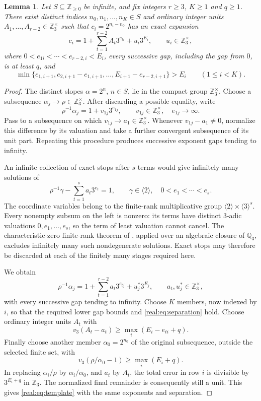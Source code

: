 \documentclass[11pt]{article}
\newtheorem{lemma}[theorem]{Lemma}
\theoremstyle{definition}
\theoremstyle{remark}
\newcommand{\Z}{\mathbb Z}
\newcommand{\Q}{\mathbb Q}
\begin{document}
\begin{lemma}\label{real:lem:extraction}
Let $S\subseteq\Z_{\ge0}$ be infinite, and fix integers
$r\ge3$, $K\ge1$ and $q\ge1$. There exist distinct indices
$n_0,n_1,\ldots,n_K\in S$ and ordinary integer units
$A_1,\ldots,A_{r-2}\in\Z_3^\times$ such that
$c_i=2^{n_i-n_0}$ has an exact expansion
\begin{equation}\label{real:eq:template}
 c_i=1+\sum_{t=1}^{r-2}A_t3^{e_{ti}}+u_i3^{E_i},
 \qquad u_i\in\Z_3^\times,
\end{equation}
where $0<e_{1i}<\cdots<e_{r-2,i}<E_i$, every successive gap,
including the gap from $0$, is at least $q$, and
\begin{equation}\label{real:eq:separation}
 \min\{e_{1,i+1},e_{2,i+1}-e_{1,i+1},\ldots,
                 E_{i+1}-e_{r-2,i+1}\}>E_i\qquad(1\le i<K).
\end{equation}
\end{lemma}
\begin{proof}
The distinct slopes $\alpha=2^n$, $n\in S$, lie in the compact group
$\Z_3^\times$. Choose a subsequence $\alpha_j\to\rho\in\Z_3^\times$.
After discarding a possible equality, write
\[
 \rho^{-1}\alpha_j=1+v_{1j}3^{e_{1j}},
 \qquad v_{1j}\in\Z_3^\times,\quad e_{1j}\to\infty.
\]
Pass to a subsequence on which $v_{1j}\to a_1\in\Z_3^\times$.
Whenever $v_{1j}-a_1\ne0$, normalize this difference by its valuation
and take a further convergent subsequence of its unit part. Repeating
this procedure produces successive exponent gaps tending to infinity.

An infinite collection of exact stops after $s$ terms would give
infinitely many solutions of
\[
 \rho^{-1}\gamma-\sum_{t=1}^{s}a_t3^{e_t}=1,
 \qquad \gamma\in\langle2\rangle,\quad 0<e_1<\cdots<e_s.
\]
The coordinate variables belong to the finite-rank multiplicative group
$\langle2\rangle\times\langle3\rangle^s$.
Every nonempty subsum on the left is nonzero: its terms have distinct
3-adic valuations $0,e_1,\ldots,e_s$, so the term of least valuation
cannot cancel. The characteristic-zero finite-rank theorem of
\cite{ESS}, applied over an algebraic closure of $\Q_3$, excludes
infinitely many such nondegenerate solutions. Exact stops may therefore
be discarded at each of the finitely many stages required here.

We obtain
\[
 \rho^{-1}\alpha_j
 =1+\sum_{t=1}^{r-2}a_t3^{e_{tj}}+u_j^*3^{E_j},
 \qquad a_t,u_j^*\in\Z_3^\times,
\]
with every successive gap tending to infinity. Choose $K$ members,
now indexed by $i$, so that the required lower gap bounds and
\eqref{real:eq:separation} hold. Choose ordinary integer units $A_t$ with
\[
 v_3(A_t-a_t)\ge\max_i(E_i-e_{ti}+q).
\]
Finally choose another member $\alpha_0=2^{n_0}$ of the original
subsequence, outside the selected finite set, with
\[
 v_3(\rho/\alpha_0-1)\ge\max_i(E_i+q).
\]
In replacing $\alpha_i/\rho$ by $\alpha_i/\alpha_0$, and $a_t$ by
$A_t$, the total error in row $i$ is divisible by $3^{E_i+q}$ in
$\Z_3$. The normalized final remainder is consequently still a unit.
This gives \eqref{real:eq:template} with the same exponents and separation.
\end{proof}
\end{document}
